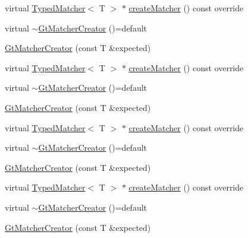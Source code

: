 \begin{DoxyCompactItemize}
virtual \mbox{\hyperlink{structfakeit_1_1TypedMatcher}{Typed\+Matcher}}$<$ T $>$ $\ast$ \mbox{\hyperlink{structfakeit_1_1internal_1_1GtMatcherCreator_ae7b905660b8aac92b70c783063c1ebdd}{create\+Matcher}} () const override
\item 
virtual \mbox{\hyperlink{structfakeit_1_1internal_1_1GtMatcherCreator_a8bd4c046db5b95b6da5470c9755b4484}{$\sim$\+Gt\+Matcher\+Creator}} ()=default
\item 
\mbox{\hyperlink{structfakeit_1_1internal_1_1GtMatcherCreator_ae89b4225c99c65c7fab77f93fea6c7c7}{Gt\+Matcher\+Creator}} (const T \&expected)
\item 
virtual \mbox{\hyperlink{structfakeit_1_1TypedMatcher}{Typed\+Matcher}}$<$ T $>$ $\ast$ \mbox{\hyperlink{structfakeit_1_1internal_1_1GtMatcherCreator_ae7b905660b8aac92b70c783063c1ebdd}{create\+Matcher}} () const override
\item 
virtual \mbox{\hyperlink{structfakeit_1_1internal_1_1GtMatcherCreator_a8bd4c046db5b95b6da5470c9755b4484}{$\sim$\+Gt\+Matcher\+Creator}} ()=default
\item 
\mbox{\hyperlink{structfakeit_1_1internal_1_1GtMatcherCreator_ae89b4225c99c65c7fab77f93fea6c7c7}{Gt\+Matcher\+Creator}} (const T \&expected)
\item 
virtual \mbox{\hyperlink{structfakeit_1_1TypedMatcher}{Typed\+Matcher}}$<$ T $>$ $\ast$ \mbox{\hyperlink{structfakeit_1_1internal_1_1GtMatcherCreator_ae7b905660b8aac92b70c783063c1ebdd}{create\+Matcher}} () const override
\item 
virtual \mbox{\hyperlink{structfakeit_1_1internal_1_1GtMatcherCreator_a8bd4c046db5b95b6da5470c9755b4484}{$\sim$\+Gt\+Matcher\+Creator}} ()=default
\item 
\mbox{\hyperlink{structfakeit_1_1internal_1_1GtMatcherCreator_ae89b4225c99c65c7fab77f93fea6c7c7}{Gt\+Matcher\+Creator}} (const T \&expected)
\item 
virtual \mbox{\hyperlink{structfakeit_1_1TypedMatcher}{Typed\+Matcher}}$<$ T $>$ $\ast$ \mbox{\hyperlink{structfakeit_1_1internal_1_1GtMatcherCreator_ae7b905660b8aac92b70c783063c1ebdd}{create\+Matcher}} () const override
\item 
virtual \mbox{\hyperlink{structfakeit_1_1internal_1_1GtMatcherCreator_a8bd4c046db5b95b6da5470c9755b4484}{$\sim$\+Gt\+Matcher\+Creator}} ()=default
\item 
\mbox{\hyperlink{structfakeit_1_1internal_1_1GtMatcherCreator_ae89b4225c99c65c7fab77f93fea6c7c7}{Gt\+Matcher\+Creator}} (const T \&expected)
\item 

\end{DoxyCompactItemize}
